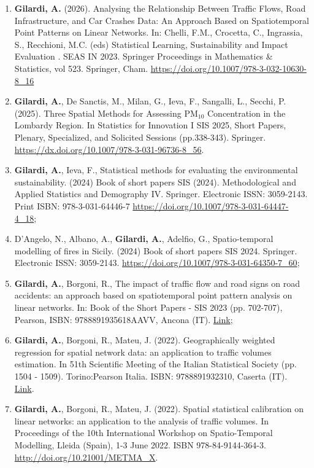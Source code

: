 \documentclass[11pt,a4paper,sans]{moderncv}
\begin{document}
  	\begin{enumerate}
  	\item \textbf{Gilardi, A.} (2026). Analysing the Relationship Between Traffic Flows, Road Infrastructure, and Car Crashes Data: An Approach Based on Spatiotemporal Point Patterns on Linear Networks. In: Chelli, F.M., Crocetta, C., Ingrassia, S., Recchioni, M.C. (eds) Statistical Learning, Sustainability and Impact Evaluation . SEAS IN 2023. Springer Proceedings in Mathematics \& Statistics, vol 523. Springer, Cham. \url{https://doi.org/10.1007/978-3-032-10630-8_16}
  	\item \textbf{Gilardi, A.}, De Sanctis, M., Milan, G., Ieva, F., Sangalli, L., Secchi, P. (2025). Three Spatial Methods for Assessing $\text{PM}_{10}$ Concentration in the Lombardy Region. In Statistics for Innovation I SIS 2025, Short Papers, Plenary, Specialized, and Solicited Sessions (pp.338-343). Springer. \url{https://dx.doi.org/10.1007/978-3-031-96736-8_56}. 
  	\item \textbf{Gilardi, A.}, Ieva, F., Statistical methods for evaluating the environmental sustainability. (2024) Book of short papers SIS (2024). Methodological and Applied Statistics and Demography IV. Springer. Electronic ISSN: 3059-2143. Print ISBN: 978-3-031-64446-7 \url{https://doi.org/10.1007/978-3-031-64447-4_18}; 
  	\item D'Angelo, N., Albano, A., \textbf{Gilardi, A.}, Adelfio, G., Spatio-temporal modelling of fires in Sicily. (2024) Book of short papers SIS 2024. Springer. Electronic ISSN: 3059-2143. \url{https://doi.org/10.1007/978-3-031-64350-7_60};
  	\item \textbf{Gilardi, A.}, Borgoni, R., The impact of traffic flow and road signs on road accidents: an approach based on spatiotemporal point pattern analysis on linear networks. In: Book of the Short Papers - SIS 2023 (pp. 702-707), Pearson, ISBN: 9788891935618AAVV, Ancona (IT). \href{https://it.pearson.com/content/dam/region-core/italy/pearson-italy/pdf/Docenti/Universit%C3%A0/bozza-book-compresso.pdf}{Link}; 
  	\item \textbf{Gilardi, A.}, Borgoni, R., Mateu, J. (2022). Geographically weighted regression for spatial network data: an application to traffic volumes estimation. In 51th Scientific Meeting of the Italian Statistical Society (pp. 1504 - 1509). Torino:Pearson Italia. ISBN: 9788891932310, Caserta (IT). \href{https://it.pearson.com/content/dam/region-core/italy/pearson-italy/pdf/Docenti/Universit%C3%A0/Sis-2022-4c-low.pdf}{Link}.
  	\item \textbf{Gilardi, A.}, Borgoni, R., Mateu, J. (2022). Spatial statistical calibration on linear networks: an application to the analysis of traffic volumes. In Proceedings of the 10th International Workshop on Spatio-Temporal Modelling, Lleida (Spain), 1-3 June 2022. ISBN 978-84-9144-364-3. \url{http://doi.org/10.21001/METMA\_X}.

\end{enumerate}
\end{document}
